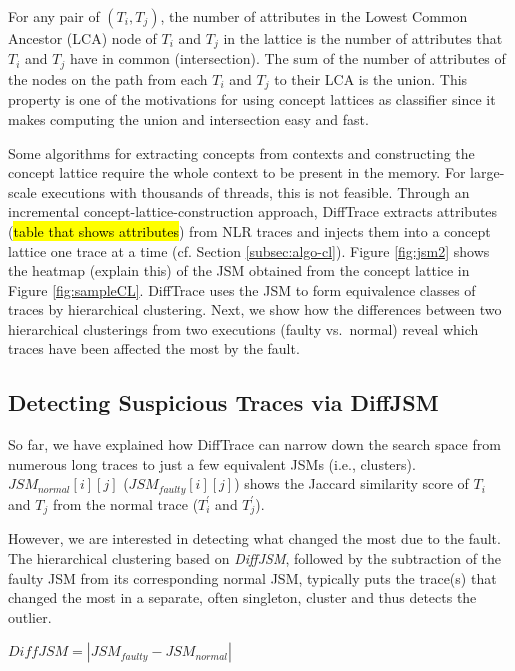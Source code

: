 For any pair of $(T_i, T_j)$, the number of attributes in the Lowest Common Ancestor (LCA) node of $T_i$ and $T_j$ in the lattice is the number of attributes that $T_i$ and $T_j$ have in common (intersection). The sum of the number of attributes of the nodes on the path from each $T_i$ and $T_j$ to their LCA is the union. This property is one of the motivations for using concept lattices as classifier since it makes computing the union and intersection easy and fast.

Some algorithms for extracting concepts from contexts and constructing the concept lattice require the whole context to be present in the memory.
%
For large-scale executions with thousands of threads, this is not feasible.
%
Through an incremental concept-lattice-construction approach, DiffTrace extracts attributes (\hl{table that shows attributes}) from NLR traces and injects them into a concept lattice one trace at a time (cf. Section \ref{subsec:algo-cl}).
%
Figure \ref{fig:jsm2} shows the heatmap (explain this) of the JSM obtained from the concept lattice in Figure \ref{fig:sampleCL}.
%
DiffTrace uses the JSM to form equivalence classes of traces by hierarchical clustering.
%
Next, we show how the differences between two hierarchical clusterings from two executions (faulty vs.~normal) reveal which traces have been affected the most by the fault.


\subsection{Detecting Suspicious Traces via DiffJSM}
So far, we have explained how DiffTrace can narrow down the search space from numerous long traces to just a few equivalent JSMs (i.e., clusters).
%
$JSM_{normal}[i][j]$ ($JSM_{faulty}[i][j]$) shows the Jaccard similarity score of $T_i$ and $T_j$ from the normal trace ($T_i^\prime$ and $T_j^\prime$).

However, we are interested in detecting what changed the most due to the fault.
%
The hierarchical clustering based on \textit{DiffJSM}, followed by the subtraction of the faulty JSM from its corresponding normal JSM, typically puts the trace(s) that changed the most in a separate, often singleton, cluster and thus detects the outlier.

$DiffJSM = |JSM_{faulty} - JSM_{normal}|$

